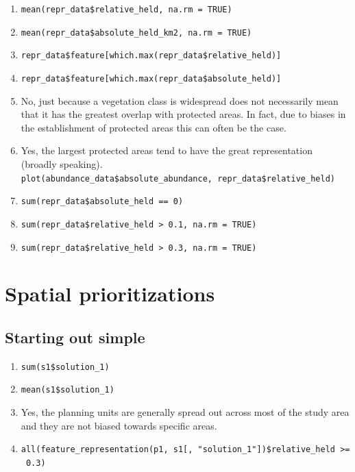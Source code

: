 \documentclass[
  12pt,
]{book}
\makeatletter
\providecommand{\tightlist}{%
  \setlength{\itemsep}{0pt}\setlength{\parskip}{0pt}}
\newenvironment{kframe}{%
\medskip{}
\setlength{\fboxsep}{.8em}
 \def\at@end@of@kframe{}%
 \ifinner\ifhmode%
  \def\at@end@of@kframe{\end{minipage}}%
  \begin{minipage}{\columnwidth}%
 \fi\fi%
 \def\FrameCommand##1{\hskip\@totalleftmargin \hskip-\fboxsep
 \colorbox{shadecolor}{##1}\hskip-\fboxsep
     \hskip-\linewidth \hskip-\@totalleftmargin \hskip\columnwidth}%
 \MakeFramed {\advance\hsize-\width
   \@totalleftmargin\z@ \linewidth\hsize
   \@setminipage}}%
 {\par\unskip\endMakeFramed%
 \at@end@of@kframe}
\newenvironment{rmdblock}[1]
  {
  \begin{itemize}
  \renewcommand{\labelitemi}{
    \raisebox{-.7\height}[0pt][0pt]{
      {\setkeys{Gin}{width=3em,keepaspectratio}\texttt{[image: images/\#1]}}
    }
  }
  \setlength{\fboxsep}{1em}
  \begin{kframe}
  \item
  }
  {
  \end{kframe}
  \end{itemize}
  }
\newenvironment{rmdanswer}
  {\begin{rmdblock}{answer}}
  {\end{rmdblock}}
\makeatother
\begin{document}
\begin{rmdanswer}
\begin{enumerate}
\def\labelenumi{\arabic{enumi}.}
\tightlist
\item
  \texttt{mean(repr\_data\$relative\_held,\ na.rm\ =\ TRUE)}
\item
  \texttt{mean(repr\_data\$absolute\_held\_km2,\ na.rm\ =\ TRUE)}
\item
  \texttt{repr\_data\$feature{[}which.max(repr\_data\$relative\_held){]}}
\item
  \texttt{repr\_data\$feature{[}which.max(repr\_data\$absolute\_held){]}}
\item
  No, just because a vegetation class is widespread does not necessarily mean that it has the greatest overlap with protected areas. In fact, due to biases in the establishment of protected areas this can often be the case.
\item
  Yes, the largest protected areas tend to have the great representation (broadly speaking).\\
  \texttt{plot(abundance\_data\$absolute\_abundance,\ repr\_data\$relative\_held)}
\item
  \texttt{sum(repr\_data\$absolute\_held\ ==\ 0)}
\item
  \texttt{sum(repr\_data\$relative\_held\ \textgreater{}\ 0.1,\ na.rm\ =\ TRUE)}
\item
  \texttt{sum(repr\_data\$relative\_held\ \textgreater{}\ 0.3,\ na.rm\ =\ TRUE)}
\end{enumerate}
\end{rmdanswer}

\hypertarget{spatial-prioritizations-1}{%
\section{Spatial prioritizations}\label{spatial-prioritizations-1}}

\hypertarget{starting-out-simple-1}{%
\subsection{Starting out simple}\label{starting-out-simple-1}}

\begin{rmdanswer}
\begin{enumerate}
\def\labelenumi{\arabic{enumi}.}
\tightlist
\item
  \texttt{sum(s1\$solution\_1)}
\item
  \texttt{mean(s1\$solution\_1)}
\item
  Yes, the planning units are generally spread out across most of the study area and they are not biased towards specific areas.
\item
  \texttt{all(feature\_representation(p1,\ s1{[},\ "solution\_1"{]})\$relative\_held\ \textgreater{}=\ 0.3)}
\end{enumerate}
\end{rmdanswer}
\end{document}
